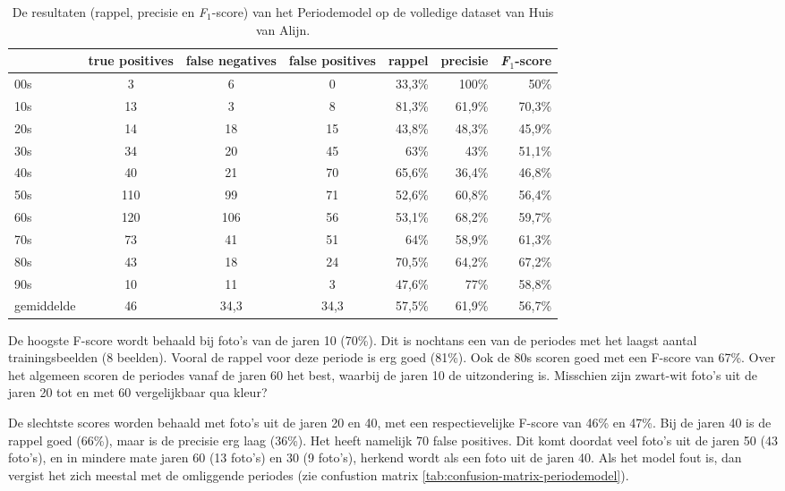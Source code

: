 \begin{table}
	\centering
    \renewcommand\arraystretch{1.2}
    \begin{tabular}{l|ccc|rrr}
        \toprule
        & true positives  & false negatives & false positives & rappel & precisie & \textit{F$_{1}$}-score \\ 
        \midrule
        00s & 3 & 6 & 0 & 33,3\% & 100\% & 50\% \\ 
        10s & 13 & 3 & 8 &  81,3\% & 61,9\% & 70,3\% \\ 
        20s & 14 & 18 & 15 & 43,8\% & 48,3\% & 45,9\% \\ 
        30s & 34 & 20 & 45  & 63\% & 43\% & 51,1\% \\ 
        40s & 40 & 21 & 70  & 65,6\% & 36,4\% & 46,8\% \\ 
        50s & 110 & 99 & 71  & 52,6\% & 60,8\% & 56,4\% \\ 
        60s & 120 & 106 & 56  & 53,1\% & 68,2\% & 59,7\% \\ 
        70s & 73 & 41 & 51  & 64\% & 58,9\% & 61,3\% \\ 
        80s & 43 & 18 & 24  & 70,5\% & 64,2\% & 67,2\% \\ 
        90s & 10 & 11 & 3  & 47,6\% & 77\% & 58,8\% \\ 
        \midrule
        gemiddelde & 46 & 34,3 & 34,3  & 57,5\% & 61,9\% & 56,7\% \\ 
        \bottomrule
    \end{tabular} 
    \caption{De resultaten (rappel, precisie en \textit{F$_{1}$}-score) van het Periodemodel op de volledige dataset van Huis van Alijn.}
    \label{tab:resultaten-periodemodel}
\end{table}

De hoogste F-score wordt behaald bij foto’s van de jaren 10 (70\%). Dit is nochtans een van de periodes met het laagst aantal trainingsbeelden (8 beelden). Vooral de rappel voor deze periode is erg goed (81\%). Ook de 80s scoren goed met een F-score van 67\%. Over het algemeen scoren de periodes vanaf de jaren 60 het best, waarbij de jaren 10 de uitzondering is. Misschien zijn zwart-wit foto’s uit de jaren 20 tot en met 60 vergelijkbaar qua kleur?

De slechtste scores worden behaald met foto’s uit de jaren 20 en 40, met een respectievelijke F-score van 46\% en 47\%. Bij de jaren 40 is de rappel goed (66\%), maar is de precisie erg laag (36\%). Het heeft namelijk 70 false positives. Dit komt doordat veel foto’s uit de jaren 50 (43 foto’s), en in mindere mate jaren 60 (13 foto’s) en 30 (9 foto’s), herkend wordt als een foto uit de jaren 40. Als het model fout is, dan vergist het zich meestal met de omliggende periodes (zie confustion matrix \ref{tab:confusion-matrix-periodemodel}).


